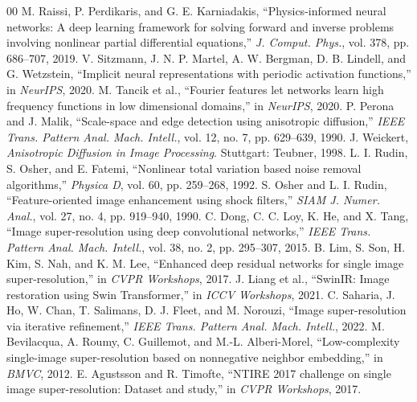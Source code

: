 \documentclass[conference]{IEEEtran}
\begin{document}
\begin{thebibliography}{00}
 M. Raissi, P. Perdikaris, and G. E. Karniadakis, ``Physics-informed neural networks: A deep learning framework for solving forward and inverse problems involving nonlinear partial differential equations,'' \textit{J. Comput. Phys.}, vol. 378, pp. 686--707, 2019.
 V. Sitzmann, J. N. P. Martel, A. W. Bergman, D. B. Lindell, and G. Wetzstein, ``Implicit neural representations with periodic activation functions,'' in \textit{NeurIPS}, 2020.
 M. Tancik et al., ``Fourier features let networks learn high frequency functions in low dimensional domains,'' in \textit{NeurIPS}, 2020.
 P. Perona and J. Malik, ``Scale-space and edge detection using anisotropic diffusion,'' \textit{IEEE Trans. Pattern Anal. Mach. Intell.}, vol. 12, no. 7, pp. 629--639, 1990.
 J. Weickert, \textit{Anisotropic Diffusion in Image Processing}. Stuttgart: Teubner, 1998.
 L. I. Rudin, S. Osher, and E. Fatemi, ``Nonlinear total variation based noise removal algorithms,'' \textit{Physica D}, vol. 60, pp. 259--268, 1992.
 S. Osher and L. I. Rudin, ``Feature-oriented image enhancement using shock filters,'' \textit{SIAM J. Numer. Anal.}, vol. 27, no. 4, pp. 919--940, 1990.
 C. Dong, C. C. Loy, K. He, and X. Tang, ``Image super-resolution using deep convolutional networks,'' \textit{IEEE Trans. Pattern Anal. Mach. Intell.}, vol. 38, no. 2, pp. 295--307, 2015.
 B. Lim, S. Son, H. Kim, S. Nah, and K. M. Lee, ``Enhanced deep residual networks for single image super-resolution,'' in \textit{CVPR Workshops}, 2017.
 J. Liang et al., ``SwinIR: Image restoration using Swin Transformer,'' in \textit{ICCV Workshops}, 2021.
 C. Saharia, J. Ho, W. Chan, T. Salimans, D. J. Fleet, and M. Norouzi, ``Image super-resolution via iterative refinement,'' \textit{IEEE Trans. Pattern Anal. Mach. Intell.}, 2022.
 M. Bevilacqua, A. Roumy, C. Guillemot, and M.-L. Alberi-Morel, ``Low-complexity single-image super-resolution based on nonnegative neighbor embedding,'' in \textit{BMVC}, 2012.
 E. Agustsson and R. Timofte, ``NTIRE 2017 challenge on single image super-resolution: Dataset and study,'' in \textit{CVPR Workshops}, 2017.
\end{thebibliography}
\end{document}
